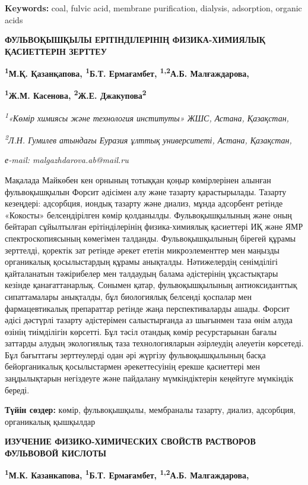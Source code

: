 {\bfseries Keywords:} coal, fulvic acid, membrane purification, dialysis,
adsorption, organic acids

{\bfseries ФУЛЬВОҚЫШҚЫЛЫ ЕРІТІНДІЛЕРІНІҢ ФИЗИКА-ХИМИЯЛЫҚ ҚАСИЕТТЕРІН
ЗЕРТТЕУ}

{\bfseries \textsuperscript{1}М.Қ. Қазанқапова, \textsuperscript{1}Б.Т.
Ермағамбет, \textsuperscript{1,2}А.Б. Малғаждарова\textsuperscript{\envelope },}

{\bfseries \textsuperscript{1}Ж.М. Касенова, \textsuperscript{2}Ж.Е.
Джакупова\textsuperscript{2}}

\emph{\textsuperscript{1}«Көмір химиясы және технология институты» ЖШС,
Астана, Қазақстан,}

\emph{\textsuperscript{2}Л.Н. Гумилев атындағы Еуразия ұлттық
университеті, Астана, Қазақстан,}

\emph{е-mail: malgazhdarova.ab@mail.ru}

Мақалада Майкөбен кен орнының тотыққан қоңыр көмірлерінен алынған
фульвоқышқылын Форсит әдісімен алу және тазарту қарастырылады. Тазарту
кезеңдері: адсорбция, иондық тазарту және диализ, мұнда адсорбент
ретінде «Кокосты» белсендірілген көмір қолданылды. Фульвоқышқылының және
оның бейтарап сұйылтылған ерітінділерінің физика-химиялық қасиеттері ИҚ
және ЯМР спектроскопиясының көмегімен талданды. Фульвоқышқылының бірегей
құрамы зерттелді, қоректік зат ретінде әрекет ететін микроэлементтер мен
маңызды органикалық қосылыстардың құрамы анықталды. Нәтижелердің
сенімділігі қайталанатын тәжірибелер мен талдаудың балама әдістерінің
ұқсастықтары кезінде қанағаттанарлық. Сонымен қатар, фульвоқышқылының
антиоксиданттық сипаттамалары анықталды, бұл биологиялық белсенді
қоспалар мен фармацевтикалық препараттар ретінде жаңа перспективаларды
ашады. Форсит әдісі дәстүрлі тазарту әдістерімен салыстырғанда аз
шығынмен таза өнім алуда өзінің тиімділігін көрсетті. Бұл тәсіл отандық
көмір ресурстарынан бағалы заттарды алудың экологиялық таза
технологияларын әзірлеудің әлеуетін көрсетеді. Бұл бағыттағы
зерттеулерді одан әрі жүргізу фульвоқышқылының басқа бейорганикалық
қосылыстармен әрекеттесуінің ерекше қасиеттері мен заңдылықтарын
негіздеуге және пайдалану мүмкіндіктерін кеңейтуге мүмкіндік береді.

{\bfseries Түйін сөздер:} көмір, фульвоқышқылы, мембраналы тазарту, диализ,
адсорбция, органикалық қышқылдар

{\bfseries ИЗУЧЕНИЕ ФИЗИКО-ХИМИЧЕСКИХ СВОЙСТВ РАСТВОРОВ ФУЛЬВОВОЙ КИСЛОТЫ}

{\bfseries \textsuperscript{1}М.К. Казанкапова, \textsuperscript{1}Б.Т.
Ермағамбет, \textsuperscript{1,2}А.Б. Малгаждарова\textsuperscript{\envelope },}

